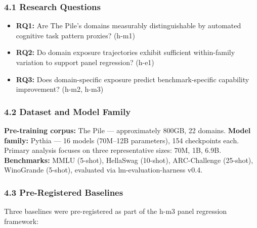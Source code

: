 
\subsubsection{4.1 Research Questions}

\begin{itemize}
\item \textbf{RQ1:} Are The Pile's domains measurably distinguishable by automated cognitive task pattern proxies? (h-m1)
\item \textbf{RQ2:} Do domain exposure trajectories exhibit sufficient within-family variation to support panel regression? (h-e1)
\item \textbf{RQ3:} Does domain-specific exposure predict benchmark-specific capability improvement? (h-m2, h-m3)
\end{itemize}

\subsubsection{4.2 Dataset and Model Family}

\textbf{Pre-training corpus:} The Pile \citep{Gao2020} --- approximately 800GB, 22 domains. \textbf{Model family:} Pythia \citep{Biderman2023} --- 16 models (70M--12B parameters), 154 checkpoints each. Primary analysis focuses on three representative sizes: 70M, 1B, 6.9B. \textbf{Benchmarks:} MMLU (5-shot), HellaSwag (10-shot), ARC-Challenge (25-shot), WinoGrande (5-shot), evaluated via lm-evaluation-harness v0.4.

\subsubsection{4.3 Pre-Registered Baselines}

Three baselines were pre-registered as part of the h-m3 panel regression framework:

\begin{table}[htbp]
\centering
{}
\end{table}

